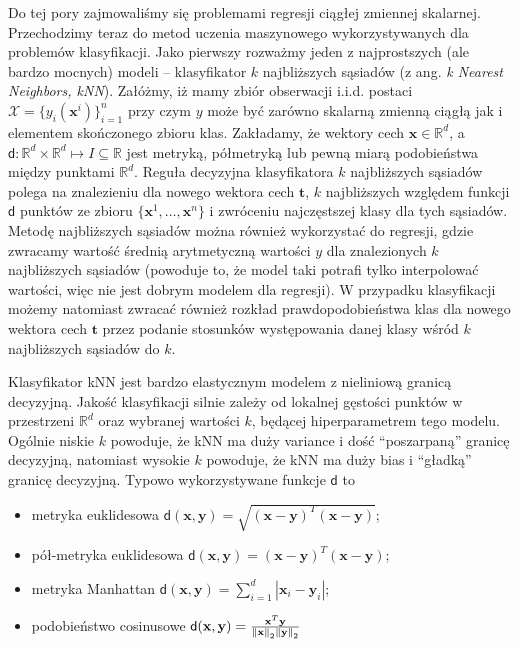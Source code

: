 \documentclass{myclass}
\numberwithin{equation}{subsection}
\begin{document}
Do tej pory zajmowaliśmy się problemami regresji ciągłej zmiennej skalarnej. Przechodzimy teraz do
metod uczenia maszynowego wykorzystywanych dla problemów klasyfikacji. Jako pierwszy rozważmy jeden
z najprostszych (ale bardzo mocnych) modeli -- klasyfikator \(k\) najbliższych sąsiadów (z ang.
\textit{k Nearest Neighbors, kNN}). Załóżmy, iż mamy zbiór obserwacji i.i.d. postaci \(\mathcal{X} =
\{y_i(\mathbf{x}^i)\}_{i=1}^n\) przy czym \(y\) może być zarówno skalarną zmienną ciągłą jak i
elementem skończonego zbioru klas. Zakładamy, że wektory cech \(\mathbf{x} \in \mathbb{R}^d\), a
\(\mathsf{d}: \mathbb{R}^d \times \mathbb{R}^d \mapsto I \subseteq \mathbb{R}\) jest metryką,
półmetryką lub pewną miarą podobieństwa między punktami \(\mathbb{R}^d\). Reguła decyzyjna
klasyfikatora \(k\) najbliższych sąsiadów polega na znalezieniu dla nowego wektora cech
\(\mathbf{t}\), \(k\) najbliższych względem funkcji \(\mathsf{d}\) punktów ze zbioru
\(\{\mathbf{x}^1,\ldots,\mathbf{x}^n\}\) i zwróceniu najczęstszej klasy dla tych sąsiadów. Metodę
najbliższych sąsiadów można również wykorzystać do regresji, gdzie zwracamy wartość średnią
arytmetyczną wartości \(y\) dla znalezionych \(k\) najbliższych sąsiadów (powoduje to, że model taki
potrafi tylko interpolować wartości, więc nie jest dobrym modelem dla regresji). W przypadku
klasyfikacji możemy natomiast zwracać również rozkład prawdopodobieństwa klas dla nowego wektora
cech \(\mathbf{t}\) przez podanie stosunków występowania danej klasy wśród \(k\) najbliższych
sąsiadów do \(k\).

Klasyfikator kNN jest bardzo elastycznym modelem z nieliniową granicą decyzyjną. Jakość klasyfikacji
silnie zależy od lokalnej gęstości punktów w przestrzeni \(\mathbb{R}^d\) oraz wybranej wartości
\(k\), będącej hiperparametrem tego modelu. Ogólnie niskie \(k\) powoduje, że kNN ma duży variance i
dość \enquote{poszarpaną} granicę decyzyjną, natomiast wysokie \(k\) powoduje, że kNN ma duży bias i
\enquote{gładką} granicę decyzyjną. Typowo wykorzystywane funkcje \(\mathsf{d}\) to
\begin{itemize}

    \item metryka euklidesowa \(\mathsf{d}(\mathbf{x},\mathbf{y}) = \sqrt{(\mathbf{x} -
    \mathbf{y})^T(\mathbf{x} - \mathbf{y})}\);

    \item pół-metryka euklidesowa \(\mathsf{d}(\mathbf{x},\mathbf{y}) = (\mathbf{x} -
    \mathbf{y})^T(\mathbf{x} - \mathbf{y})\);

    \item metryka Manhattan \(\mathsf{d}(\mathbf{x}, \mathbf{y}) = \sum_{i=1}^d |\mathbf{x}_i -
    \mathbf{y}_i|\);
    
    \item podobieństwo cosinusowe \(\mathsf{d}(\mathbf{x}, \mathbf{y}) =
    \frac{\mathbf{x}^T\mathbf{y}}{\norm{\mathbf{x}}_2 \norm{\mathbf{y}}_2}\)
    
\end{itemize}
\end{document}
